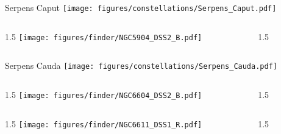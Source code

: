 \documentclass[final]{beamer}
\newlength{\colwidth}
\begin{document}

\begin{frame}[t]{\LARGE Serpens Caput}
    \centering
    \texttt{[image: figures/constellations/Serpens\_Caput.pdf]}
\end{frame}


\begin{frame}[t]{}
    \begin{columns}[T]
        \begin{column}{1.5\colwidth}
            \centering
            \texttt{[image: figures/finder/NGC5904\_DSS2\_B.pdf]}
        \end{column}
        \begin{column}{1.5\colwidth}
            \Large
            
        \end{column}
    \end{columns}
    \vspace{\fill}
\end{frame}


\begin{frame}[t]{\LARGE Serpens Cauda}
    \centering
    \texttt{[image: figures/constellations/Serpens\_Cauda.pdf]}
\end{frame}


\begin{frame}[t]{}
    \begin{columns}[T]
        \begin{column}{1.5\colwidth}
            \centering
            \texttt{[image: figures/finder/NGC6604\_DSS2\_B.pdf]}
        \end{column}
        \begin{column}{1.5\colwidth}
            \Large
            
        \end{column}
    \end{columns}
    \vspace{\fill}
    \begin{columns}[T]
        \begin{column}{1.5\colwidth}
            \centering
            \texttt{[image: figures/finder/NGC6611\_DSS1\_R.pdf]}
        \end{column}
        \begin{column}{1.5\colwidth}
            \Large
            
        \end{column}
    \end{columns}
\end{frame}
\end{document}
